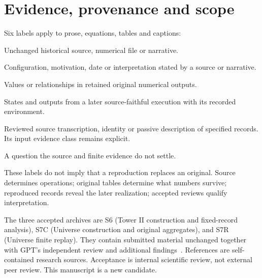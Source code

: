 \documentclass[11pt,a4paper]{article}
\newcommand{\ev}[1]{\textsf{\small #1}}
\begin{document}
\section{Evidence, provenance and scope}\label{sec:evidence}
Six labels apply to prose, equations, tables and captions:
\begin{description}[style=nextline,leftmargin=0pt,labelindent=0pt]
\item[\ev{ORIGINAL}] Unchanged historical source, numerical file or narrative.
\item[\ev{ATTRIBUTED}] Configuration, motivation, date or interpretation stated by a source or narrative.
\item[\ev{OBSERVED IN HISTORICAL DATA}] Values or relationships in retained original numerical outputs.
\item[\ev{REPRODUCED}] States and outputs from a later source-faithful execution with its recorded environment.
\item[\ev{DERIVED}] Reviewed source transcription, identity or passive description of specified records. Its input evidence class remains explicit.
\item[\ev{UNRESOLVED}] A question the source and finite evidence do not settle.
\end{description}
These labels do not imply that a reproduction replaces an original. Source determines operations; original tables determine what numbers survive; reproduced records reveal the later realization; accepted reviews qualify interpretation.

The three accepted archives are S6 (Tower II construction and fixed-record analysis), S7C (Universe construction and original aggregates), and S7R (Universe finite replay). They contain submitted material unchanged together with GPT's independent review and additional findings~\citep{s6review,s7creview,s7rreview}. References are self-contained research sources. Acceptance is internal scientific review, not external peer review. This manuscript is a new candidate.
\end{document}
